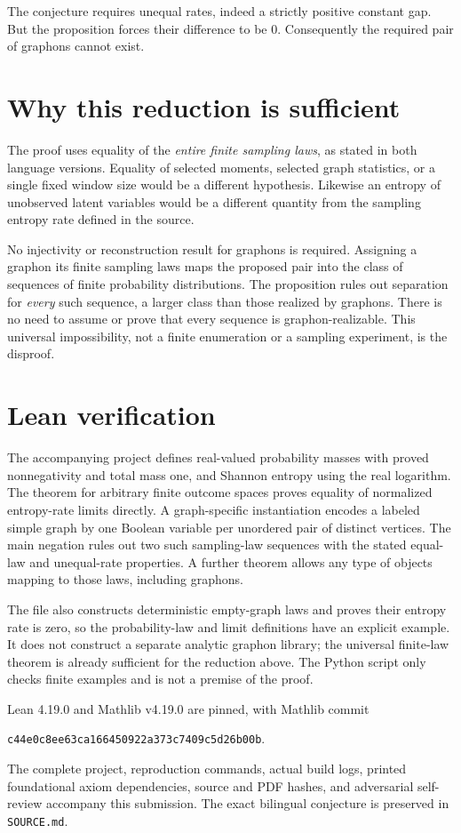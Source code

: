 \documentclass[11pt]{article}
\begin{document}
The conjecture requires unequal rates, indeed a strictly positive constant
gap. But the proposition forces their difference to be $0$. Consequently
the required pair of graphons cannot exist.

\section*{Why this reduction is sufficient}
The proof uses equality of the \emph{entire finite sampling laws}, as stated
in both language versions. Equality of selected moments, selected graph
statistics, or a single fixed window size would be a different hypothesis.
Likewise an entropy of unobserved latent variables would be a different
quantity from the sampling entropy rate defined in the source.

No injectivity or reconstruction result for graphons is required. Assigning
a graphon its finite sampling laws maps the proposed pair into the class
of sequences of finite probability distributions. The proposition rules out
separation for \emph{every} such sequence, a larger class than those realized
by graphons. There is no need to assume or prove that every sequence is
graphon-realizable. This universal impossibility, not a finite enumeration
or a sampling experiment, is the disproof.

\section*{Lean verification}
The accompanying project defines real-valued probability masses with proved
nonnegativity and total mass one, and Shannon entropy using the real logarithm.
The theorem for arbitrary finite outcome spaces proves equality of normalized
entropy-rate limits directly. A graph-specific instantiation encodes a
labeled simple graph by one Boolean variable per unordered pair of distinct
vertices. The main negation rules out two such sampling-law sequences with
the stated equal-law and unequal-rate properties. A further theorem allows
any type of objects mapping to those laws, including graphons.

The file also constructs deterministic empty-graph laws and proves their
entropy rate is zero, so the probability-law and limit definitions have an
explicit example. It does not construct a separate analytic graphon library;
the universal finite-law theorem is already sufficient for the reduction
above. The Python script only checks finite examples and is not a premise of
the proof.

Lean 4.19.0 and Mathlib v4.19.0 are pinned, with Mathlib commit
\begin{center}\small\texttt{c44e0c8ee63ca166450922a373c7409c5d26b00b}.\end{center}
The complete project, reproduction commands, actual build logs, printed
foundational axiom dependencies, source and PDF hashes, and adversarial
self-review accompany this submission. The exact bilingual conjecture is
preserved in \texttt{SOURCE.md}.
\end{document}

